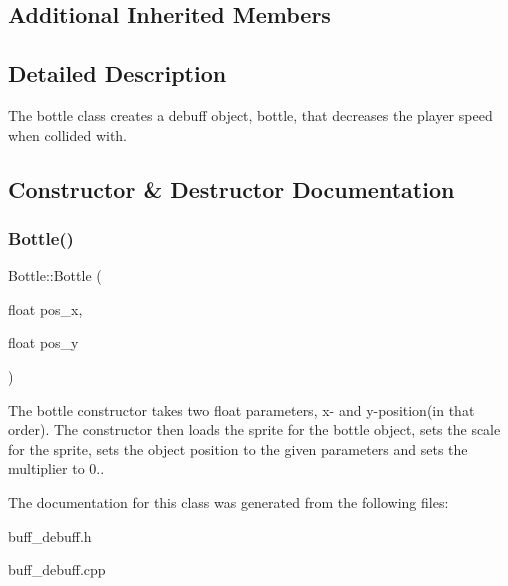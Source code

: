 \subsection*{Additional Inherited Members}


\subsection{Detailed Description}
The bottle class creates a debuff object, bottle, that decreases the player speed when collided with. 

\subsection{Constructor \& Destructor Documentation}
\mbox{\label{classBottle_aabe46dbc52bfd8cf2a0088d96f86a767}} 
\subsubsection{\texorpdfstring{Bottle()}{Bottle()}}
{\footnotesize\ttfamily Bottle\+::\+Bottle (\begin{DoxyParamCaption}\item[{float}]{pos\+\_\+x,  }\item[{float}]{pos\+\_\+y }\end{DoxyParamCaption})}

The bottle constructor takes two float parameters, x-\/ and y-\/position(in that order). The constructor then loads the sprite for the bottle object, sets the scale for the sprite, sets the object position to the given parameters and sets the multiplier to 0.. 

The documentation for this class was generated from the following files\+:\begin{DoxyCompactItemize}
\item 
buff\+\_\+debuff.\+h\item 
buff\+\_\+debuff.\+cpp\end{DoxyCompactItemize}
